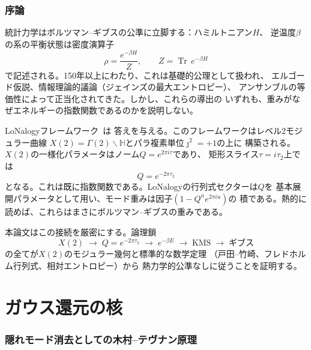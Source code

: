 \documentclass[12pt]{article}
\theoremstyle{plain}
\theoremstyle{definition}
\numberwithin{equation}{section}
\newcommand{\HH}{\mathbb{H}}
\DeclareMathOperator{\Tr}{Tr}
\begin{document}
\setcounter{page}{1}
\tableofcontents
\newpage


\section*{序論}

統計力学はボルツマン--ギブスの公準に立脚する：ハミルトニアン$H$、
逆温度$\beta$の系の平衡状態は密度演算子
\begin{equation}\label{eq:gibbs}
\rho = \frac{e^{-\beta H}}{Z},\qquad
Z = \Tr\,e^{-\beta H}
\end{equation}
で記述される。150年以上にわたり、これは基礎的公理として扱われ、
エルゴード仮説、情報理論的議論（ジェインズの最大エントロピー）、
アンサンブルの等価性によって正当化されてきた。しかし、これらの導出の
いずれも、重みがなぜエネルギーの指数関数であるのかを説明しない。

LoNalogyフレームワーク~\cite{LoNalogyv87,YMmassGap,ParticleCosmo}は
答えを与える。このフレームワークはレベル2モジュラー曲線
$X(2)=\Gamma(2)\backslash\HH$とパラ複素単位$\jmath^2=+1$の上に
構築される。$X(2)$の一様化パラメータはノーム$Q=e^{2\pi i\tau}$であり、
矩形スライス$\tau=i\tau_2$上では
\begin{equation}
Q = e^{-2\pi\tau_2}
\end{equation}
となる。これは既に指数関数である。LoNalogyの行列式セクターは$Q$を
基本展開パラメータとして用い、モード重みは因子$(1-Q^n e^{2\pi iu})$の
積である。熱的に読めば、これらはまさにボルツマン--ギブスの重みである。

本論文はこの接続を厳密にする。論理鎖
\begin{equation}
X(2) \;\to\; Q=e^{-2\pi\tau_2} \;\to\; e^{-\beta E}
\;\to\; \text{KMS} \;\to\; \text{ギブス}
\end{equation}
の全てが$X(2)$のモジュラー幾何と標準的な数学定理
（戸田--竹崎、フレドホルム行列式、相対エントロピー）から
熱力学的公準なしに従うことを証明する。


\part{ガウス還元の核}

\section{隠れモード消去としての木村--テヴナン原理}\label{sec:KT}
\end{document}
